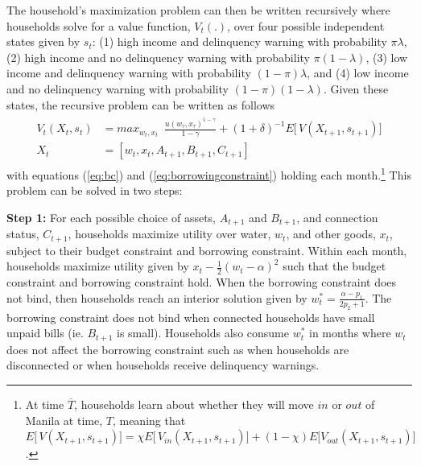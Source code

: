 \documentclass[12pt,table]{article}
\begin{document}
The household's maximization problem can then be written recursively where households solve for a value function, $V_t(.)$, over four possible independent states given by $s_{t}$: (1) high income and delinquency warning with probability $\pi\lambda$, (2) high income and no delinquency warning with probability $\pi(1-\lambda)$, (3) low income and delinquency warning with probability $(1-\pi)\lambda$, and (4) low income and no delinquency warning with probability $(1-\pi)(1-\lambda)$.  Given these states, the recursive problem can be written as follows
\begin{align}
\label{eq:valmax}
\begin{split}
V_t(X_{t},s_t) &= max_{w_t,x_{t}} \,\,\, \frac{u(w_{\tau},x_{\tau})^{1-\gamma}}{1-\gamma}   + (1+\delta)^{-1}  E \Big[\, V(X_{t+1},s_{t+1})\Big] \\
X_t &= [w_t,x_t,A_{t+1},B_{t+1},C_{t+1}] 
\end{split}
\end{align}
with equations (\ref{eq:bc}) and (\ref{eq:borrowingconstraint}) holding each month.\footnote{At time $\overline{T}$, households learn about whether they will move $in$ or $out$ of Manila at time, $T$, meaning that $E \Big[\, V(X_{t+1},s_{t+1})\Big] =  \chi E \Big[\,V_{in}(X_{t+1},s_{t+1})\Big] + (1-\chi) E\Big[V_{out}(X_{t+1},s_{t+1})\Big]$.}  This problem can be solved in two steps: %


\textbf{Step 1:} For each possible choice of assets, $A_{t+1}$ and $B_{t+1}$, and connection status, $C_{t+1}$, households maximize utility over water, $w_t$, and other goods, $x_t$, subject to their budget constraint and borrowing constraint.  Within each month, households maximize utility given by $ x_t -  \frac{1}{2} (w_t - \alpha)^2 $ such that the budget constraint and borrowing constraint hold.  When the borrowing constraint does not bind, then households reach an interior solution given by $w_t^{*} =  \frac{ \alpha - p_1}{2p_2 + 1}$.  The borrowing constraint does not bind when connected households have small unpaid bills (ie. $B_{t+1}$ is small).  Households also consume $w_t^{*}$ in months where $w_t$ does not affect the borrowing constraint such as when households are disconnected or when households receive delinquency warnings.
\end{document}
